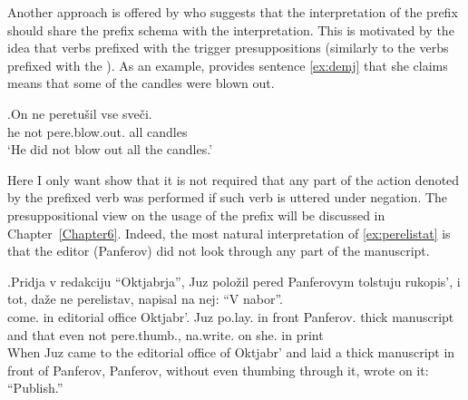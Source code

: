 Another approach is offered by \citet{Demjjanow:97} who suggests that the  interpretation of the prefix  should share the prefix schema with the  interpretation. This is motivated by the idea that verbs prefixed with the   trigger presuppositions (similarly to the verbs prefixed with the  ). As an example, \citet{Demjjanow:97} provides sentence \ref{ex:demj} that she claims means that some of the candles were blown out.

\exg.\label{ex:demj}On ne peretu\v{s}il vse sve\v{c}i.\\
he not pere.blow.out. all candles\\
\trans `He did not blow out all the candles.'\\

Here I only want show that it is not required that any part of the action denoted by the  prefixed verb was performed if such verb is uttered under negation. The presuppositional view on the  usage of the prefix  will be discussed in Chapter~\ref{Chapter6}. Indeed, the most natural interpretation of \ref{ex:perelistat} is that the editor (Panferov) did not look through any part of the manuscript.

\exg.\label{ex:perelistat}Pridja v redakciju ``Oktjabrja'', Juz polo\v{z}il pered Panferovym tolstuju rukopis', i tot, da\v{z}e ne perelistav, napisal na nej: ``V nabor''.\\
come. in {editorial office} Oktjabr'. Juz po.lay. {in front} Panferov. thick manuscript and that even not pere.thumb., na.write. on she. in 	print\\
\vspace{0.5em}
When Juz came to the editorial office of Oktjabr' and laid a thick manuscript in front of Panferov, Panferov, without even thumbing through it, wrote on it: ``Publish.''




